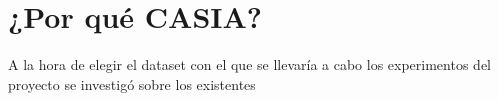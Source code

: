 
\section{¿Por qué CASIA?}

A la hora de elegir el dataset con el que se llevaría a cabo los experimentos del proyecto se investigó sobre los existentes